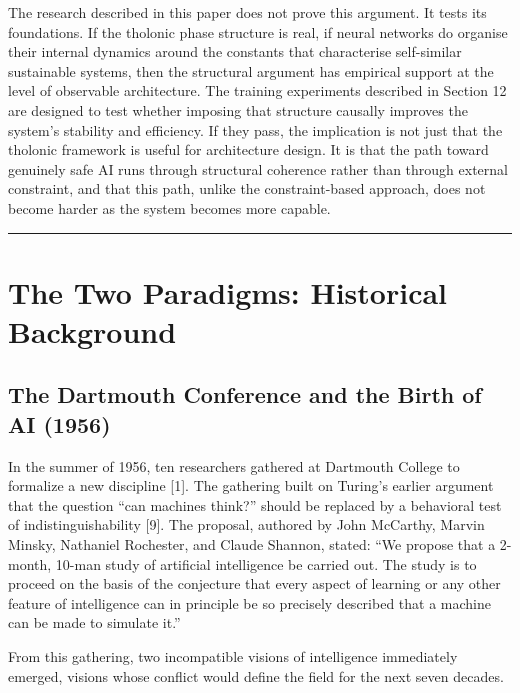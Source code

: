 \documentclass[12pt]{article}
\begin{document}
The research described in this paper does not prove this argument. It
tests its foundations. If the tholonic phase structure is real, if
neural networks do organise their internal dynamics around the constants
that characterise self-similar sustainable systems, then the structural
argument has empirical support at the level of observable architecture.
The training experiments described in Section 12 are designed to test
whether imposing that structure causally improves the system's stability
and efficiency. If they pass, the implication is not just that the
tholonic framework is useful for architecture design. It is that the
path toward genuinely safe AI runs through structural coherence rather
than through external constraint, and that this path, unlike the
constraint-based approach, does not become harder as the system becomes
more capable.

\begin{center}\rule{0.5\linewidth}{0.5pt}\end{center}

\section{The Two Paradigms: Historical Background}\label{the-two-paradigms-historical-background}

\subsection{The Dartmouth Conference and the Birth of AI (1956)}\label{the-dartmouth-conference-and-the-birth-of-ai-1956}

In the summer of 1956, ten researchers gathered at Dartmouth College to
formalize a new discipline {[}1{]}. The gathering built on Turing's
earlier argument that the question ``can machines think?'' should be
replaced by a behavioral test of indistinguishability {[}9{]}. The
proposal, authored by John McCarthy, Marvin Minsky, Nathaniel Rochester,
and Claude Shannon, stated: ``We propose that a 2-month, 10-man study of
artificial intelligence be carried out. The study is to proceed on the
basis of the conjecture that every aspect of learning or any other
feature of intelligence can in principle be so precisely described that
a machine can be made to simulate it.''

From this gathering, two incompatible visions of intelligence
immediately emerged, visions whose conflict would define the field for
the next seven decades.
\end{document}
